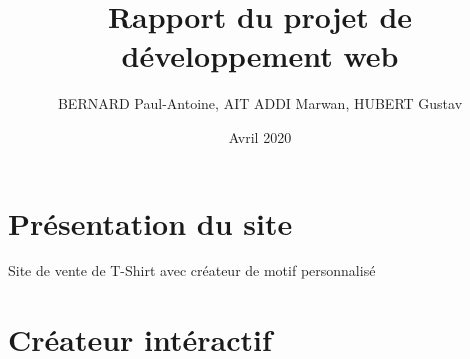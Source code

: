 \documentclass{article}
\title{Rapport du projet de d\'{e}veloppement web}
\author{BERNARD Paul-Antoine, AIT ADDI Marwan, HUBERT Gustav }
\date{Avril 2020}
\begin{document}
\maketitle

\tableofcontents
\newpage

\section{Pr\'{e}sentation du site}

Site de vente de T-Shirt avec créateur de motif personnalisé

\section{Cr\'{e}ateur int\'{e}ractif}
\end{document}
